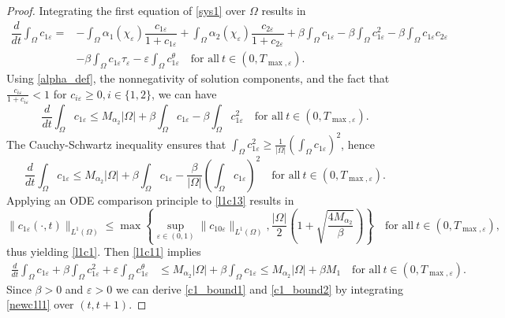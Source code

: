 \documentclass[a4paper,10pt]{article}
\theoremstyle{definition}
\begin{document}
\begin{proof}
Integrating the first equation of \eqref{sys1} over $\Omega$ results in
  \begin{align}
  \label{l1c11}
    \nonumber \dfrac{d}{dt}\int_\Omega c_{1\varepsilon} = & - \int_\Omega \alpha_1(\chi_\varepsilon) \dfrac{c_{1\varepsilon}}{1 + c_{1\varepsilon}} + \int_\Omega \alpha_2(\chi_\varepsilon) \dfrac{c_{2\varepsilon}}{1 + c_{2\varepsilon}} + \beta \int_\Omega c_{1\varepsilon} - \beta \int_\Omega c_{1\varepsilon}^2 - \beta \int_\Omega c_{1\varepsilon} c_{2\varepsilon}  \\[5pt]
    & - \beta \int_\Omega c_{1\varepsilon} \tau_\varepsilon - \varepsilon \int_\Omega c_{1\varepsilon}^\theta  \quad \text{for all}~ t \in (0, T_{\max, \varepsilon}).
  \end{align}
  Using \eqref{alpha_def}, the nonnegativity of solution components, and the fact that $\frac{c_{i\varepsilon}}{1 + c_{i\varepsilon}} < 1$ for $c_{i\varepsilon} \geq 0, i \in \{1, 2\}$, we can have
  \begin{equation*}
    \label{l1c12}
    \dfrac{d}{dt} \int_\Omega c_{1\varepsilon} \leq M_{\alpha_2} |\Omega| + \beta \int_\Omega c_{1\varepsilon} - \beta \int_\Omega c_{1\varepsilon}^2 \quad \text{for all}~ t \in (0, T_{\max, \varepsilon}).
  \end{equation*}
  The Cauchy-Schwartz inequality ensures that $\int_\Omega c_{1\varepsilon}^2 \geq \frac{1}{|\Omega|} (\int_\Omega c_{1\varepsilon})^2$, hence
  \begin{equation}
    \label{l1c13}
    \dfrac{d}{dt} \int_\Omega c_{1\varepsilon} \leq M_{\alpha_2} |\Omega| + \beta \int_\Omega c_{1\varepsilon} - \frac{\beta}{|\Omega|} \left(\int_\Omega c_{1\varepsilon}\right)^2  \quad \text{for all}~ t \in (0, T_{\max, \varepsilon}).
  \end{equation}
 Applying an ODE comparison principle to \eqref{l1c13} results in
  \begin{equation*}
    \|c_{1\varepsilon}(\cdot, t)\|_{L^1(\Omega)} \leq \max\left\{\sup_{\varepsilon \in (0, 1)}\|c_{10\varepsilon}\|_{L^1(\Omega)}, \frac{|\Omega|}{2} \left(1 + \sqrt{\frac{4 M_{\alpha_2}}{\beta}}\right)\right\} \quad \text{for all}~ t \in (0, T_{\max, \varepsilon}),
  \end{equation*}
  thus yielding \eqref{l1c1}. Then \eqref{l1c11} implies
  \begin{align}
  \label{newc1l1}
    \frac{d}{dt}  \int_\Omega c_{1\varepsilon} + \beta \int_\Omega c_{1\varepsilon}^2 + \varepsilon \int_\Omega c_{1\varepsilon}^\theta & \leq M_{\alpha_2} |\Omega| + \beta  \int_\Omega c_{1\varepsilon}   \leq M_{\alpha_2} |\Omega| + \beta M_1\quad \text{for all}~ t \in (0, T_{\max, \varepsilon}).
  \end{align}
  Since $\beta > 0$ and $\varepsilon > 0$ we can derive \eqref{c1_bound1} and \eqref{c1_bound2} by integrating \eqref{newc1l1} over $(t, t + 1)$.


\end{proof}
\end{document}
